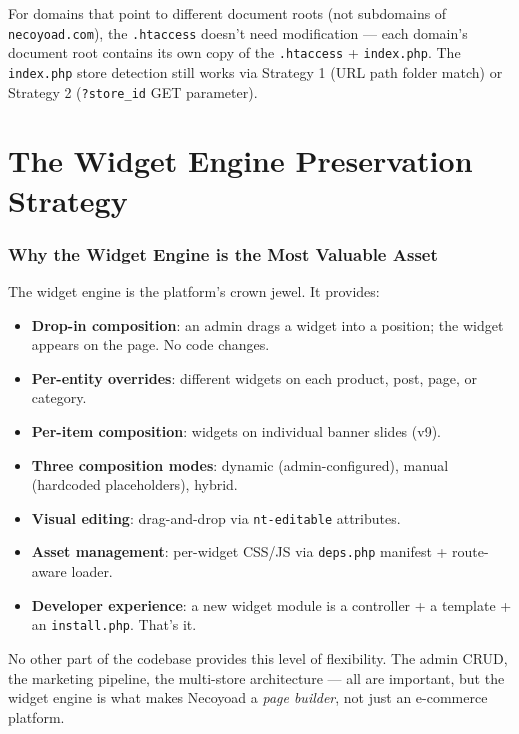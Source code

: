 \documentclass[11pt,a4paper]{article}
\begin{document}
For domains that point to different document roots (not subdomains of
\texttt{necoyoad.com}), the \texttt{.htaccess} doesn't need modification
--- each domain's document root contains its own copy of the
\texttt{.htaccess} + \texttt{index.php}. The \texttt{index.php} store
detection still works via Strategy 1 (URL path folder match) or
Strategy 2 (\texttt{?store\_id} GET parameter).

\part{The Widget Engine Preservation Strategy}\label{part:widget-engine}

\section{Why the Widget Engine is the Most Valuable Asset}\label{sec:why-valuable}

The widget engine is the platform's crown jewel. It provides:

\begin{itemize}[leftmargin=1.6em,itemsep=2pt]
  \item \textbf{Drop-in composition}: an admin drags a widget into a
        position; the widget appears on the page. No code changes.
  \item \textbf{Per-entity overrides}: different widgets on each
        product, post, page, or category.
  \item \textbf{Per-item composition}: widgets on individual banner
        slides (v9).
  \item \textbf{Three composition modes}: dynamic (admin-configured),
        manual (hardcoded placeholders), hybrid.
  \item \textbf{Visual editing}: drag-and-drop via \texttt{nt-editable}
        attributes.
  \item \textbf{Asset management}: per-widget CSS/JS via
        \texttt{deps.php} manifest + route-aware loader.
  \item \textbf{Developer experience}: a new widget module is a
        controller + a template + an \texttt{install.php}. That's it.
\end{itemize}

No other part of the codebase provides this level of flexibility. The
admin CRUD, the marketing pipeline, the multi-store architecture ---
all are important, but the widget engine is what makes Necoyoad a
\emph{page builder}, not just an e-commerce platform.
\end{document}
